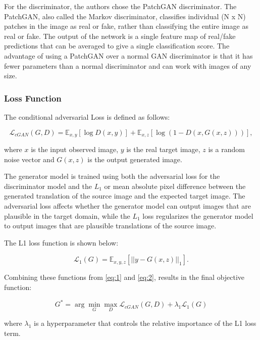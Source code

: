For the discriminator, the authors chose the PatchGAN discriminator. The PatchGAN, also called the Markov discriminator, classifies individual (N x N) patches in the image as real or fake, rather than classifying the entire image as real or fake. The output of the network is a single feature map of real/fake predictions that can be averaged to give a single classification score. The advantage of using a PatchGAN over a normal \ac{GAN} discriminator is that it has fewer parameters than a normal discriminator and can work with images of any size.

\subsubsection*{Loss Function}

The conditional adversarial Loss is defined as follows:

\begin{equation}
    \mathcal{L}_{cGAN}(G,D) = \mathbb{E}_{x,y} [\log{D(x,y)}] + \mathbb{E}_{x,z} [\log{(1-D(x,G(x,z)))}],
    \label{eq:1}
\end{equation}

where $x$ is the input observed image, $y$ is the real target image, $z$ is a random noise vector and $G(x,z)$ is the output generated image.

The generator model is trained using both the adversarial loss for the discriminator model and the $L_1$ or mean absolute pixel difference between the generated translation of the source image and the expected target image. The adversarial loss affects whether the generator model can output images that are plausible in the target domain, while the $L_1$ loss regularizes the generator model to output images that are plausible translations of the source image.

The L1 loss function is shown below:

\begin{equation}
    \mathcal{L}_{1}(G) = \mathbb{E}_{x,y,z} [||y-G(x,z)||_1].
    \label{eq:2}
\end{equation}

Combining these functions from \ref{eq:1} and \ref{eq:2}, results in the final objective function:

\begin{equation}
    G^* = \arg \min_{G}\max_{D} \mathcal{L}_{cGAN}(G,D) + \lambda_1  \mathcal{L}_{1}(G)
\end{equation}

where $\lambda_1$ is a hyperparameter that controls the relative importance of the L1 loss term. 

